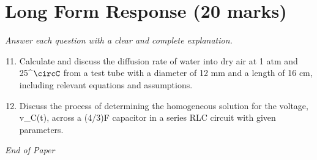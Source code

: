\documentclass[12pt]{article}
\begin{document}
\section*{Long Form Response (20 marks)}
\textit{Answer each question with a clear and complete explanation.}
\begin{enumerate}[label=\arabic*.]
\setcounter{enumi}{10}
\item Calculate and discuss the diffusion rate of water into dry air at 1 atm and 25^\ensuremath{\circC} from a test tube with a diameter of 12 mm and a length of 16 cm, including relevant equations and assumptions.
\item Discuss the process of determining the homogeneous solution for the voltage, v\_C(t), across a (4/3)F capacitor in a series RLC circuit with given parameters.
\end{enumerate}

\vfill
\noindent\textit{End of Paper}
\end{document}
